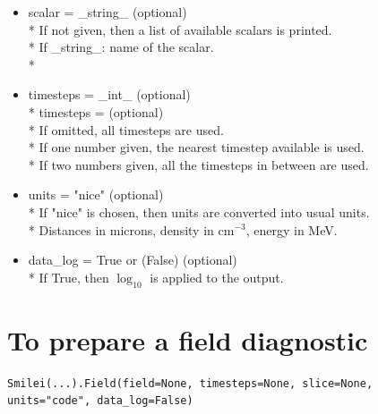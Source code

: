 \documentclass[11pt]{article}
\newcommand{\code}[1]{\colorbox{yellow!15}{\ttfamily #1}}
\begin{document}
\begin{itemize}
\item \code{scalar} = \code{\_string\_} (optional)\\*
	If not given, then a list of available scalars is printed.\\*
	If \code{\_string\_}: name of the scalar.\\*

\item \code{timesteps} =  \code{\_int\_ }          (optional)\\*
	\code{timesteps} = \code{[\_int\_, \_int\_]}   (optional)\\*
	If omitted, all timesteps are used.\\*
	If one number  given, the nearest timestep available is used.\\*
	If two numbers given, all the timesteps in between are used.

\item \code{units} = \code{"nice"}    (optional)\\*
	If \code{"nice"} is chosen, then units are converted into usual units.\\*
	Distances in microns, density in cm$^{-3}$, energy in MeV.

\item \code{data\_log} = \code{True} or (\code{False})       (optional)\\*
	If True, then $\log_{10}$ is applied to the output.
\end{itemize}
\vspace{0.5cm}

\section{To prepare a field diagnostic}

\begin{lstlisting}
Smilei(...).Field(field=None, timesteps=None, slice=None, units="code", data_log=False)
\end{lstlisting}
\end{document}
